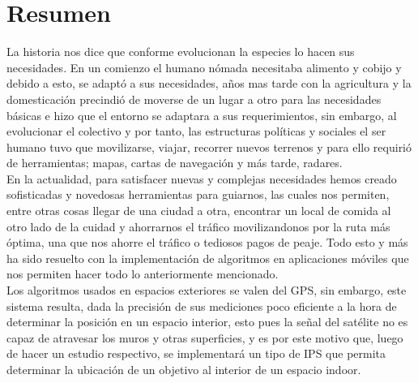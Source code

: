 \chapter*{Resumen}

La historia nos dice que conforme evolucionan la especies lo hacen sus necesidades. En un comienzo el humano nómada necesitaba alimento y cobijo y debido a esto, se adaptó a sus necesidades, años mas tarde con la agricultura y la domesticación precindió de moverse de un lugar a otro para las necesidades básicas e hizo que el entorno se adaptara a sus requerimientos, sin embargo, al evolucionar el colectivo y por tanto, las estructuras políticas y sociales el ser humano tuvo que movilizarse, viajar, recorrer nuevos terrenos y para ello requirió de herramientas; mapas, cartas de navegación y más tarde, radares.\\

En la actualidad, para satisfacer nuevas y complejas necesidades hemos creado sofisticadas y novedosas herramientas para guiarnos, las cuales nos permiten, entre otras cosas llegar de una ciudad a otra, encontrar un local de comida al otro lado de la cuidad y ahorrarnos el tráfico movilizandonos por la ruta más óptima, una que nos ahorre el tráfico o tediosos pagos de peaje. Todo esto y más ha sido resuelto con la implementación de algoritmos en aplicaciones móviles que nos permiten hacer todo lo anteriormente mencionado.\\

Los algoritmos usados en espacios exteriores se valen del \ac{GPS}, sin embargo, este sistema resulta, dada la precisión de sus mediciones poco eficiente a la hora de determinar la posición en un espacio interior, esto pues la señal del satélite no es capaz de atravesar los muros y otras superficies, y es por este motivo que, luego de hacer un estudio respectivo, se implementará un tipo de \ac{IPS} que permita determinar la ubicación de un objetivo al interior de un espacio indoor.
